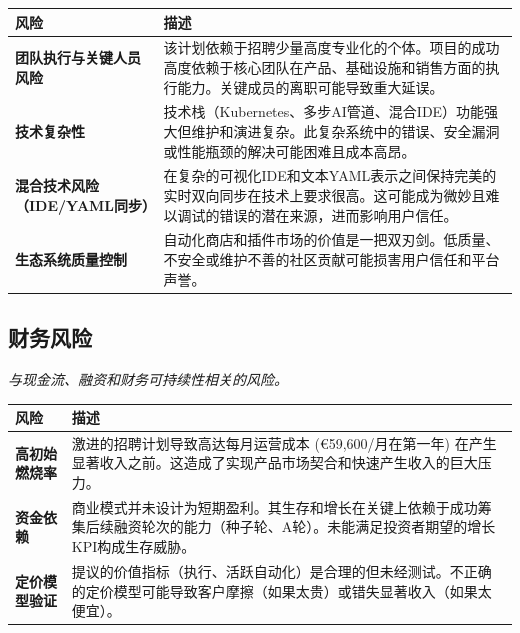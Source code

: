 \documentclass[11pt, a4paper, oneside]{article}
\begin{document}
\begin{table}[H]
\centering
\begin{tabularx}{\textwidth}{@{}lL@{}}
\toprule
\textbf{风险} & \textbf{描述} \\
\midrule
\textbf{团队执行与关键人员风险} & 该计划依赖于招聘少量高度专业化的个体。项目的成功高度依赖于核心团队在产品、基础设施和销售方面的执行能力。关键成员的离职可能导致重大延误。 \\
\addlinespace
\textbf{技术复杂性} & 技术栈（Kubernetes、多步AI管道、混合IDE）功能强大但维护和演进复杂。此复杂系统中的错误、安全漏洞或性能瓶颈的解决可能困难且成本高昂。 \\
\addlinespace
\textbf{混合技术风险（IDE/YAML同步）} & 在复杂的可视化IDE和文本YAML表示之间保持完美的实时双向同步在技术上要求很高。这可能成为微妙且难以调试的错误的潜在来源，进而影响用户信任。 \\
\addlinespace
\textbf{生态系统质量控制} & 自动化商店和插件市场的价值是一把双刃剑。低质量、不安全或维护不善的社区贡献可能损害用户信任和平台声誉。 \\
\bottomrule
\end{tabularx}
\end{table}



\newpage
\subsection{财务风险}
\textit{与现金流、融资和财务可持续性相关的风险。}

\begin{table}[H]
\centering
\begin{tabularx}{\textwidth}{@{}lL@{}}
\toprule
\textbf{风险} & \textbf{描述} \\
\midrule
\textbf{高初始燃烧率} & 激进的招聘计划导致高达每月运营成本 (€59,600/月在第一年) 在产生显著收入之前。这造成了实现产品市场契合和快速产生收入的巨大压力。 \\
\addlinespace
\textbf{资金依赖} & 商业模式并未设计为短期盈利。其生存和增长在关键上依赖于成功筹集后续融资轮次的能力（种子轮、A轮）。未能满足投资者期望的增长KPI构成生存威胁。 \\
\addlinespace
\textbf{定价模型验证} & 提议的价值指标（执行、活跃自动化）是合理的但未经测试。不正确的定价模型可能导致客户摩擦（如果太贵）或错失显著收入（如果太便宜）。 \\
\bottomrule
\end{tabularx}
\end{table}
\end{document}
